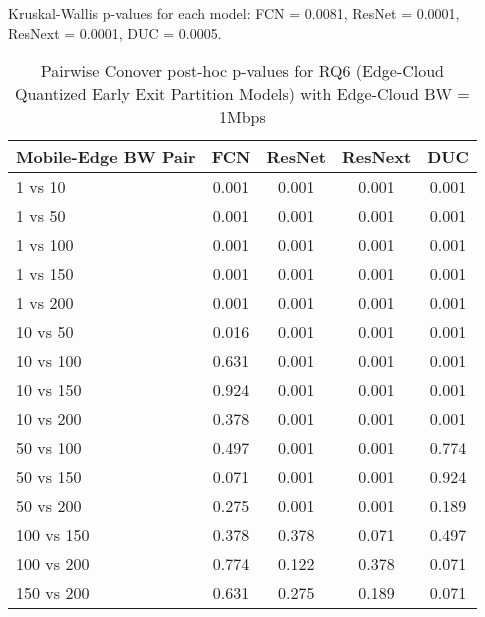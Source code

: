 \begin{table}[h]
\centering
\caption{Pairwise Conover post-hoc p-values for RQ6 (Edge-Cloud Quantized Early Exit Partition Models) with Edge-Cloud BW = 1Mbps}
\label{tab:conover_edge_cloud_quantized_earlyexit_partition_ec1}
\smallskip
Kruskal-Wallis p-values for each model: FCN = 0.0081, ResNet = 0.0001, ResNext = 0.0001, DUC = 0.0005.

\begin{tabular}{lcccc}
\toprule
Mobile-Edge BW Pair & FCN & ResNet & ResNext & DUC \\
\midrule
1 vs 10 & 0.001 & 0.001 & 0.001 & 0.001 \\
1 vs 50 & 0.001 & 0.001 & 0.001 & 0.001 \\
1 vs 100 & 0.001 & 0.001 & 0.001 & 0.001 \\
1 vs 150 & 0.001 & 0.001 & 0.001 & 0.001 \\
1 vs 200 & 0.001 & 0.001 & 0.001 & 0.001 \\
10 vs 50 & 0.016 & 0.001 & 0.001 & 0.001 \\
10 vs 100 & 0.631 & 0.001 & 0.001 & 0.001 \\
10 vs 150 & 0.924 & 0.001 & 0.001 & 0.001 \\
10 vs 200 & 0.378 & 0.001 & 0.001 & 0.001 \\
50 vs 100 & 0.497 & 0.001 & 0.001 & 0.774 \\
50 vs 150 & 0.071 & 0.001 & 0.001 & 0.924 \\
50 vs 200 & 0.275 & 0.001 & 0.001 & 0.189 \\
100 vs 150 & 0.378 & 0.378 & 0.071 & 0.497 \\
100 vs 200 & 0.774 & 0.122 & 0.378 & 0.071 \\
150 vs 200 & 0.631 & 0.275 & 0.189 & 0.071 \\
\bottomrule
\end{tabular}
\end{table}


